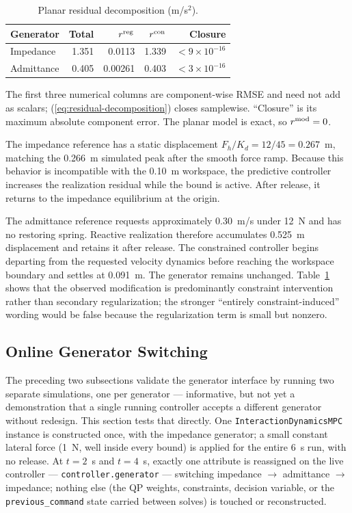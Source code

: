 \documentclass[journal]{IEEEtran}
\begin{document}
\begin{table}[t]
\centering
\caption{Planar residual decomposition (m/s$^2$).}
\label{tab:planar-decomposition}
\small
\begin{tabular}{@{}lrrrr@{}}
\toprule
Generator & Total & $r^{\rm reg}$ & $r^{\rm con}$ & Closure \\
\midrule
Impedance  & 1.351 & 0.0113 & 1.339 & $<9\!\times\!10^{-16}$ \\
Admittance & 0.405 & 0.00261 & 0.403 & $<3\!\times\!10^{-16}$ \\
\bottomrule
\end{tabular}

\vspace{2pt}
\raggedright\footnotesize
The first three numerical columns are component-wise RMSE and need not
add as scalars; (\ref{eq:residual-decomposition}) closes samplewise.
``Closure'' is its maximum absolute component error. The planar model is
exact, so $r^{\rm mod}=0$.
\end{table}

The impedance reference has a static displacement
$F_h/K_d=12/45=0.267$~m, matching the 0.266~m simulated peak after the
smooth force ramp. Because this behavior is incompatible with the
0.10~m workspace, the predictive controller increases the realization
residual while the bound is active. After release, it returns to the
impedance equilibrium at the origin.

The admittance reference requests approximately 0.30~m/s under 12~N and
has no restoring spring. Reactive realization therefore accumulates
0.525~m displacement and retains it after release. The constrained
controller begins departing from the requested velocity dynamics before
reaching the workspace boundary and settles at 0.091~m. The generator
remains unchanged. Table~\ref{tab:planar-decomposition} shows that the
observed modification is predominantly constraint intervention rather
than secondary regularization; the stronger ``entirely
constraint-induced'' wording would be false because the regularization
term is small but nonzero.

\subsection{Online Generator Switching}
\label{sec:switching}

The preceding two subsections validate the generator interface by
running two separate simulations, one per generator --- informative, but
not yet a demonstration that a single running controller accepts a
different generator without redesign. This section tests that directly.
One \texttt{InteractionDynamicsMPC} instance is constructed once, with
the impedance generator; a small constant lateral force (1~N, well
inside every bound) is applied for the entire 6~s run, with no release.
At $t=2$~s and $t=4$~s, exactly one attribute is reassigned on the live
controller --- \texttt{controller.generator} --- switching impedance
$\rightarrow$ admittance $\rightarrow$ impedance; nothing else (the QP
weights, constraints, decision variable, or the
\texttt{previous\_command} state carried between solves) is touched or
reconstructed.
\end{document}
